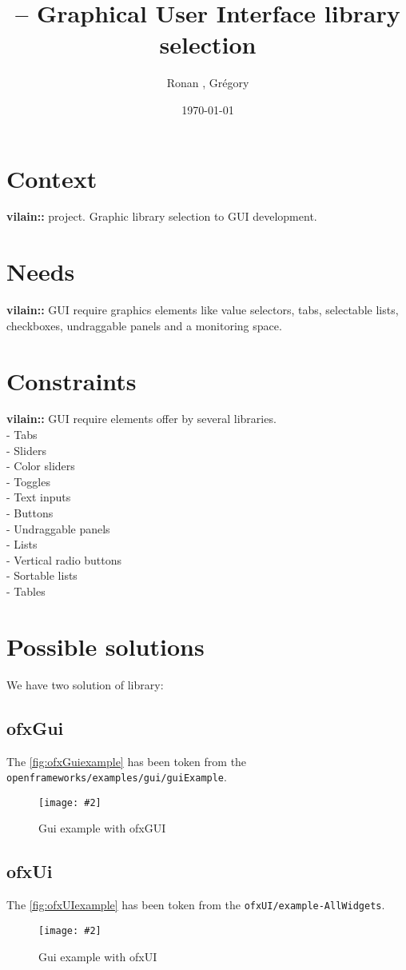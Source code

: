 \documentclass[a4paper,titlepage,oneside]{article}
\author{Ronan \bsc{Legardinier}, Grégory \bsc{David}}
\title{\vilain{} -- Graphical User Interface library selection}
\date{\today{}}
\newcommand{\image}[5][\textwidth]{%
    \begin{figure}[h]
        \centering
            \begin{minipage}[c]{#1}
                \centering
                \texttt{[image: \#2]}
                \caption{#4}
                \label{#5}
            \end{minipage}
    \end{figure}
}
\newcommand{\vilain}{\textbf{vilain::}}
\begin{document}
\maketitle{}
\tableofcontents{}
\newpage
	
\section{Context}
\vilain{} project. Graphic library selection to GUI development.

\section{Needs}
\vilain{} GUI require graphics elements like value selectors, tabs,
selectable lists, checkboxes, undraggable panels and a monitoring
space.

\section{Constraints}
\vilain{} GUI require elements offer by several libraries.\\
- Tabs\\
- Sliders\\
- Color sliders\\
- Toggles\\
- Text inputs\\
- Buttons\\
- Undraggable panels\\
- Lists\\
- Vertical radio buttons\\
- Sortable lists\\
- Tables

\section{Possible solutions}
We have two solution of library:
\subsection{ofxGui}
The \figurename \vref{fig:ofxGuiexample} has been token from the
\texttt{openframeworks/examples/gui/guiExample}.
\image{data/ofxGui.jpg}{width=13cm}{Gui example with
  ofxGUI}{fig:ofxGuiexample}
			
\subsection{ofxUi}
The \figurename \vref{fig:ofxUIexample} has been token from the
\texttt{ofxUI/example-AllWidgets}.
\image{data/ofxUI.jpg}{width=13cm}{Gui example with
  ofxUI}{fig:ofxUIexample}
								
\end{document}
